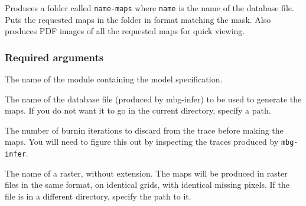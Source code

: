 Produces a folder called \texttt{name-maps} where \texttt{name} is the name of the database file.
Puts the requested maps in the folder in format matching the mask. Also produces PDF
images of all the requested maps for quick viewing.




\subsubsection{Required arguments%
}
\setcounter{listcnt0}{0}
\begin{list}{.}
{
\setlength{\rightmargin}{\leftmargin}
}

\item The name of the module containing the model specification.

\item The name of the database file (produced by mbg-infer) to be used to generate the
maps. If you do not want it to go in the current directory, specify a path.

\item The number of burnin iterations to discard from the trace before making the maps.
You will need to figure this out by inspecting the traces produced by \texttt{mbg-infer}.

\item The name of a raster, without extension. The maps will be produced in raster files
in the same format, on identical grids, with identical missing pixels. If the file
is in a different directory, specify the path to it.
\end{list}




